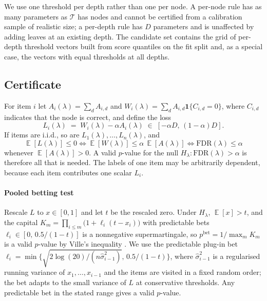 \documentclass[preprint,12pt]{elsarticle}
\theoremstyle{definition}
\theoremstyle{remark}
\newcommand{\fdr}{\mathrm{FDR}}
\DeclareMathOperator{\E}{\mathbb{E}}
\begin{document}
We use one threshold per depth rather than one per node. A per-node rule has as
many parameters as $\mathcal{T}$ has nodes and cannot be certified from a
calibration sample of realistic size; a per-depth rule has $D$ parameters and is
unaffected by adding leaves at an existing depth. The candidate set contains
the grid of per-depth threshold vectors built from score quantiles on the fit
split and, as a special case, the vectors with equal thresholds at all depths.

\subsection{Certificate}
\label{sec:method-cert}

For item $i$ let $A_i(\lambda)=\sum_d A_{i,d}$ and
$W_i(\lambda)=\sum_d A_{i,d}\mathbf{1}\{C_{i,d}=0\}$, where $C_{i,d}$ indicates
that the node is correct, and define the loss
\begin{equation}
  L_i(\lambda) \;=\; W_i(\lambda)-\alpha A_i(\lambda)\;\in\;[-\alpha D,\,(1-\alpha)D].
  \label{eq:loss}
\end{equation}
If items are i.i.d., so are $L_1(\lambda),\dots,L_n(\lambda)$, and
\begin{equation}
  \E[L(\lambda)]\le 0 \iff \E[W(\lambda)]\le\alpha\,\E[A(\lambda)]
  \iff \fdr(\lambda)\le\alpha
  \label{eq:equiv}
\end{equation}
whenever $\E[A(\lambda)]>0$. A valid $p$-value for the null
$H_\lambda:\fdr(\lambda)>\alpha$ is therefore all that is needed. The labels of
one item may be arbitrarily dependent, because each item contributes one scalar
$L_i$.

\paragraph{Pooled betting test}
Rescale $L$ to $x\in[0,1]$ and let $t$ be the rescaled zero. Under $H_\lambda$,
$\E[x]>t$, and the capital
$K_m=\prod_{i\le m}\bigl(1+\ell_i(t-x_i)\bigr)$ with predictable bets
$\ell_i\in[0,\,0.5/(1-t)]$ is a nonnegative supermartingale, so
$p^{\mathrm{bet}}=1/\max_m K_m$ is a valid $p$-value by Ville's inequality
\cite{waudbysmith2024estimating}. We use the predictable plug-in bet
$\ell_i=\min\{\sqrt{2\log(20)/(n\hat\sigma^2_{i-1})},\,0.5/(1-t)\}$, where
$\hat\sigma^2_{i-1}$ is a regularised running variance of $x_1,\dots,x_{i-1}$
and the items are visited in a fixed random order; the bet adapts to the small
variance of $L$ at conservative thresholds. Any predictable bet in the stated
range gives a valid $p$-value.
\end{document}
